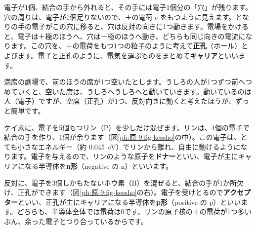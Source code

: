 電子が1個、結合の手から外れると、その手には電子1個分の「穴」が残ります。穴の周りは、電子が1個足りないので、＋の電荷 $e$ をもつように見えます。となりの手の電子がこの穴に移ると、穴は反対の向きに1つ動きます。電場をかけると、電子は＋極のほうへ、穴は－極のほうへ動き、どちらも同じ向きの電流になります。この穴を、＋の電荷をもつ1つの粒子のように考えて\textbf{正孔}（ホール）とよびます。電子と正孔のように、電気を運ぶものをまとめて\textbf{キャリア}といいます。

\begin{phmijika}[劇場の席の空き]
満席の劇場で、前のほうの席が1つ空いたとします。うしろの人が1つずつ前へつめていくと、空いた席は、うしろへうしろへと動いていきます。動いているのは人（電子）ですが、空席（正孔）が1つ、反対向きに動くと考えたほうが、ずっと簡単です。
\end{phmijika}

ケイ素に、電子を5個もつリン（P）を少しだけ混ぜます。リンは、4個の電子で結合の手を作り、1個が余ります（図\ref{ph:原-9:fig-kessho}の中）。この電子は、とても小さなエネルギー（約 \qty{0.045}{eV}）でリンから離れ、自由に動けるようになります。電子を与えるので、リンのような原子を\textbf{ドナー}といい、電子が主にキャリアになる半導体を\textbf{n形}（negative の n）といいます。

反対に、電子を3個しかもたないホウ素（B）を混ぜると、結合の手が1か所欠け、正孔ができます（図\ref{ph:原-9:fig-kessho}の右）。電子を受けとるので\textbf{アクセプター}といい、正孔が主にキャリアになる半導体を\textbf{p形}（positive の p）といいます。どちらも、半導体全体では電荷は0です。リンの原子核の＋の電荷が1つ多いぶん、余った電子とつり合っているからです。


